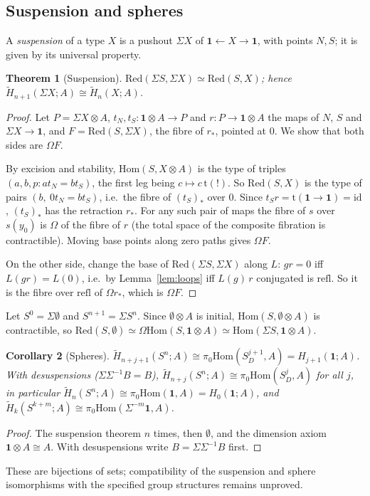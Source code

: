 \documentclass[11pt]{amsart}
\numberwithin{equation}{section}
\newtheorem{theorem}{Theorem}[section]
\newtheorem{corollary}[theorem]{Corollary}
\theoremstyle{definition}
\theoremstyle{remark}
\newcommand{\Hom}{\mathrm{Hom}}
\newcommand{\id}{\mathrm{id}}
\newcommand{\one}{\mathbf{1}}
\newcommand{\tmap}{\mathrm{t}}
\begin{document}
\subsection*{Suspension and spheres}
A \emph{suspension} of a type $X$ is a pushout $\Sigma X$ of $\one\leftarrow X\to\one$,
with points $N,S$; it is given by its universal property.
\begin{theorem}[Suspension]
$\mathrm{Red}(\Sigma S,\Sigma X)\simeq\mathrm{Red}(S,X)$; hence
$\tilde H_{n+1}(\Sigma X;A)\cong\tilde H_n(X;A)$.
\end{theorem}
\begin{proof}
Let $P=\Sigma X\otimes A$, $t_N,t_S:\one\otimes A\to P$ and $r:P\to\one\otimes A$
the maps of $N$, $S$ and $\Sigma X\to\one$, and $F=\mathrm{Red}(S,\Sigma X)$,
the fibre of $r_*$, pointed at $0$. We show that both sides are $\Omega F$.

By excision and stability, $\Hom(S,X\otimes A)$ is the type of triples
$(a,b,p:at_N=bt_S)$, the first leg being $c\mapsto c\,\tmap(!)$. So
$\mathrm{Red}(S,X)$ is the type of pairs $(b,\ 0t_N=bt_S)$, i.e.\ the fibre of
$(t_S)_*$ over $0$. Since $t_Sr=\tmap(\one\to\one)=\id$, $(t_S)_*$ has the retraction
$r_*$. For any such pair of maps the fibre of $s$ over $s(y_0)$ is
$\Omega$ of the fibre of $r$ (the total space of the composite fibration is
contractible). Moving base points along zero paths gives $\Omega F$.

On the other side, change the base of $\mathrm{Red}(\Sigma S,\Sigma X)$ along $L$:
$gr=0$ iff $L(gr)=L(0)$, i.e.\ by Lemma~\ref{lem:loops} iff $L(g)\,r$ conjugated
is $\mathrm{refl}$. So it is the fibre over $\mathrm{refl}$ of $\Omega r_*$, which
is $\Omega F$.
\end{proof}

Let $S^0=\Sigma\emptyset$ and $S^{n+1}=\Sigma S^n$. Since $\emptyset\otimes A$ is
initial, $\Hom(S,\emptyset\otimes A)$ is contractible, so
$\mathrm{Red}(S,\emptyset)\simeq\Omega\Hom(S,\one\otimes A)\simeq\Hom(\Sigma S,\one\otimes A)$.
\begin{corollary}[Spheres]
$\tilde H_{n+j+1}(S^n;A)\cong\pi_0\Hom(S^{j+1}_D,A)=H_{j+1}(\one;A)$. With
desuspensions ($\Sigma\Sigma^{-1}B=B$), $\tilde H_{n+j}(S^n;A)\cong\pi_0\Hom(S^j_D,A)$
for all $j$, in particular $\tilde H_n(S^n;A)\cong\pi_0\Hom(\one,A)=H_0(\one;A)$,
and $\tilde H_k(S^{k+m};A)\cong\pi_0\Hom(\Sigma^{-m}\one,A)$.
\end{corollary}
\begin{proof}
The suspension theorem $n$ times, then $\emptyset$, and the dimension axiom
$\one\otimes A\cong A$. With desuspensions write $B=\Sigma\Sigma^{-1}B$ first.
\end{proof}
These are bijections of sets; compatibility of the suspension and sphere
isomorphisms with the specified group structures remains unproved.
\end{document}
